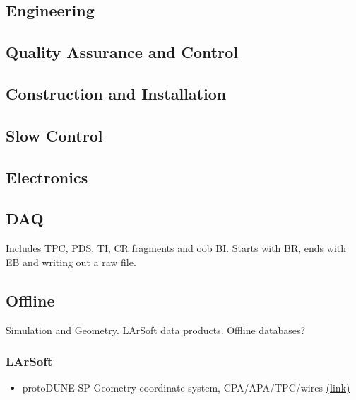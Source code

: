 \documentclass[letterpaper,twoside,onecolumn,report]{memoir}
\begin{document}
\subsection{Engineering}
\label{sec:eng}



\subsection{Quality Assurance and Control}
\label{sec:qaqc}

\subsection{Construction and Installation}
\label{sec:inst}

\subsection{Slow Control}
\label{sec:slow}

\subsection{Electronics}
\label{sec:elec}

\subsection{DAQ}
\label{sec:daq}

Includes TPC, PDS, TI, CR fragments and oob BI.  Starts with BR, ends
with EB and writing out a raw file.

\subsection{Offline}
\label{sec:offline}

Simulation and Geometry.  LArSoft data products.  Offline databases?

\subsubsection{LArSoft}

\begin{itemize}
\item protoDUNE-SP Geometry coordinate system, CPA/APA/TPC/wires \href{https://cdcvs.fnal.gov/redmine/projects/dunetpc/wiki/DUNE_Geometries#ProtoDUNE-SP-Geometry}{(link)}
\end{itemize}
\end{document}
